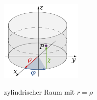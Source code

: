 

\begin{figure}
	\centering
	\includegraphics[width=4cm]{papers/geodaeten/Abbildungen/Linienelemente/LinZyl1}
	\caption{zylindrischer Raum mit $r = \rho$}
	\label{geodaeten:figure:Linienelemente:Zylinder:figure2}
	\cite{geodaeten:polarkoordinaten}
\end{figure}
